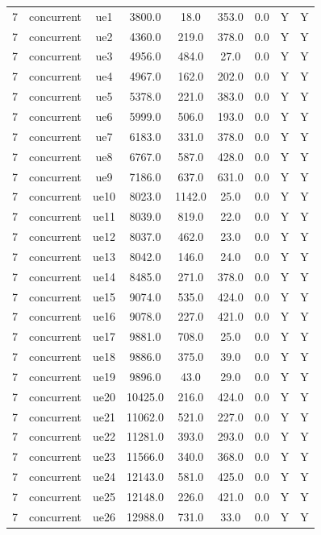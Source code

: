 \begin{table}[ht]
\begin{tabular}{|c|c|c|c|c|c|c|c|c|}
\hline
7 & concurrent & ue1 & 3800.0 & 18.0 & 353.0 & 0.0 & Y & Y \\
7 & concurrent & ue2 & 4360.0 & 219.0 & 378.0 & 0.0 & Y & Y \\
7 & concurrent & ue3 & 4956.0 & 484.0 & 27.0 & 0.0 & Y & Y \\
7 & concurrent & ue4 & 4967.0 & 162.0 & 202.0 & 0.0 & Y & Y \\
7 & concurrent & ue5 & 5378.0 & 221.0 & 383.0 & 0.0 & Y & Y \\
7 & concurrent & ue6 & 5999.0 & 506.0 & 193.0 & 0.0 & Y & Y \\
7 & concurrent & ue7 & 6183.0 & 331.0 & 378.0 & 0.0 & Y & Y \\
7 & concurrent & ue8 & 6767.0 & 587.0 & 428.0 & 0.0 & Y & Y \\
7 & concurrent & ue9 & 7186.0 & 637.0 & 631.0 & 0.0 & Y & Y \\
7 & concurrent & ue10 & 8023.0 & 1142.0 & 25.0 & 0.0 & Y & Y \\
7 & concurrent & ue11 & 8039.0 & 819.0 & 22.0 & 0.0 & Y & Y \\
7 & concurrent & ue12 & 8037.0 & 462.0 & 23.0 & 0.0 & Y & Y \\
7 & concurrent & ue13 & 8042.0 & 146.0 & 24.0 & 0.0 & Y & Y \\
7 & concurrent & ue14 & 8485.0 & 271.0 & 378.0 & 0.0 & Y & Y \\
7 & concurrent & ue15 & 9074.0 & 535.0 & 424.0 & 0.0 & Y & Y \\
7 & concurrent & ue16 & 9078.0 & 227.0 & 421.0 & 0.0 & Y & Y \\
7 & concurrent & ue17 & 9881.0 & 708.0 & 25.0 & 0.0 & Y & Y \\
7 & concurrent & ue18 & 9886.0 & 375.0 & 39.0 & 0.0 & Y & Y \\
7 & concurrent & ue19 & 9896.0 & 43.0 & 29.0 & 0.0 & Y & Y \\
7 & concurrent & ue20 & 10425.0 & 216.0 & 424.0 & 0.0 & Y & Y \\
7 & concurrent & ue21 & 11062.0 & 521.0 & 227.0 & 0.0 & Y & Y \\
7 & concurrent & ue22 & 11281.0 & 393.0 & 293.0 & 0.0 & Y & Y \\
7 & concurrent & ue23 & 11566.0 & 340.0 & 368.0 & 0.0 & Y & Y \\
7 & concurrent & ue24 & 12143.0 & 581.0 & 425.0 & 0.0 & Y & Y \\
7 & concurrent & ue25 & 12148.0 & 226.0 & 421.0 & 0.0 & Y & Y \\
7 & concurrent & ue26 & 12988.0 & 731.0 & 33.0 & 0.0 & Y & Y \\

\end{tabular}
\end{table}
